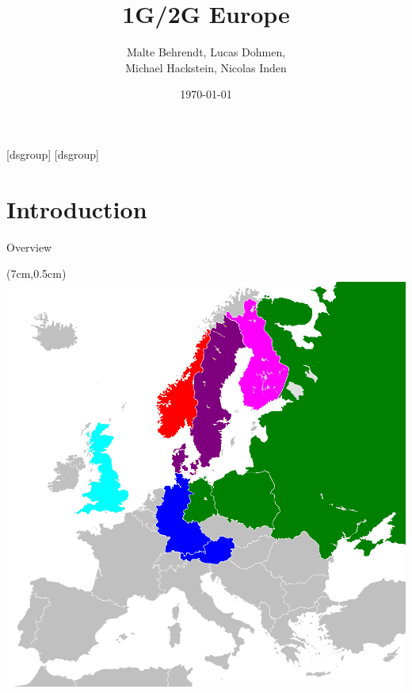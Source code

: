 \documentclass[10pt]{beamer}
\title{1G/2G Europe}
\subtitle{}
\author{Malte Behrendt, Lucas Dohmen,\\Michael Hackstein, Nicolas Inden}
\institute{Development of IT Standards}
\date{\today}
\begin{document}


\frame{\titlepage} 




[dsgroup]
[dsgroup]
\setcounter{page}{1} 

\section{Introduction}
\begin{frame}{Overview}
  \textblockorigin{0.0cm}{2.0cm}
  \tableofcontents[currentsection]
  
  \begin{textblock*}{6cm}(7cm,0.5cm)
   \includegraphics[width=1\columnwidth]{./pictures/0GNetworkStandards.png}
  \end{textblock*}
\end{frame}

\end{document}

